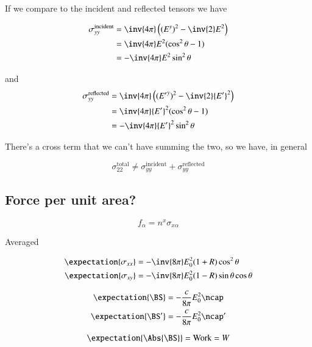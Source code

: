 If we compare to the incident and reflected tensors we have

\begin{align*}
\sigma_{y y}^{\text{incident}} 
&= \inv{4 \pi} \left( (E^y)^2 -\inv{2} E^2 \right) \\
&= \inv{4 \pi} E^2 ( \cos^2\theta - 1 ) \\
&= -\inv{4 \pi} E^2 \sin^2\theta 
\end{align*}

and
\begin{align*}
\sigma_{y y}^{\text{reflected}} 
&= \inv{4 \pi} \left( ({E'}^y)^2 -\inv{2} {E'}^2 \right) \\
&= \inv{4 \pi} {E'}^2 ( \cos^2\theta - 1 ) \\
&= -\inv{4 \pi} {E'}^2 \sin^2\theta 
\end{align*}

There's a cross term that we can't have summing the two, so we have, in general

\begin{equation}\label{eqn:relativisticElectrodynamicsT9:660}
\sigma_{2 2}^{\text{total}} \ne 
\sigma_{y y}^{\text{incident}} 
+\sigma_{y y}^{\text{reflected}} 
\end{equation}

\subsection{Force per unit area?}

\begin{equation}\label{eqn:relativisticElectrodynamicsT9:230}
f_\alpha = n^x \sigma_{x \alpha} 
\end{equation}

Averaged

\begin{align}\label{eqn:relativisticElectrodynamicsT9:250}
\expectation{\sigma_{xx}} &= -\inv{8 \pi} E_0^2 ( 1 + R) \cos^2\theta \\
\expectation{\sigma_{xy}} &= -\inv{8 \pi} E_0^2 ( 1 - R) \sin\theta \cos\theta
\end{align}

\begin{align}\label{eqn:relativisticElectrodynamicsT9:270}
\expectation{\BS} &= -\frac{c}{8 \pi} E_0^2 \ncap \\
\expectation{\BS'} &= -\frac{c}{8 \pi} E_0^2 \ncap'
\end{align}

\begin{equation}\label{eqn:relativisticElectrodynamicsT9:290}
\expectation{\Abs{\BS}} = \text{Work} = W
\end{equation}

